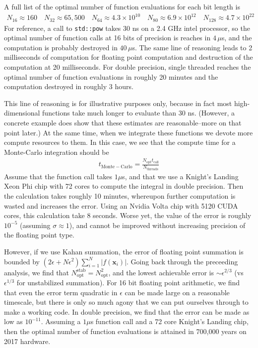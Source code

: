 \documentclass[landscape]{article}
\numberwithin{equation}{section}
\begin{document}
A full list of the optimal number of function evaluations for each bit length is
\begin{align*}
N_{16} \approx 160 \quad N_{32} \approx 65,500 \quad N_{64} \approx 4.3\times 10^{10} \quad N_{80} \approx 6.9\times 10^{12} \quad N_{128} \approx 4.7\times 10^{22}
\end{align*}
For reference, a call to \texttt{std::pow} takes 30 ns on a 2.4 GHz intel processor, so the optimal number of function calls at 16 bits of precision is reaches in $4 \, \mu$s, and the computation is probably destroyed in $40\, \mu$s.
The same line of reasoning leads to 2 milliseconds of computation for floating point computation and destruction of the computation at 20 milliseconds.
For double precision, single threaded reaches the optimal number of function evaluations in roughly 20 minutes and the computation destroyed in roughly 3 hours.

This line of reasoning is for illustrative purposes only, because in fact most high-dimensional functions take much longer to evaluate than 30 ns.
(However, a concrete example does show that these estimates are reasonable--more on that point later.)
At the same time, when we integrate these functions we devote more compute resources to them.
In this case, we see that the compute time for a Monte-Carlo integration should be
\begin{align*}
t_{\mathrm{Monte-Carlo} }= \frac{N_{\mathrm{opt}}t_{\mathrm{call}}}{N_{\mathrm{threads}}}
\end{align*}
Assume that the function call takes $1 \mu$s, and that we use a Knight's Landing Xeon Phi chip with 72 cores to compute the integral in double precision.
Then the calculation takes roughly 10 minutes, whereupon further computation is wasted and increases the error.
Using an Nvidia Volta chip with 5120 CUDA cores, this calculation take 8 seconds.
Worse yet, the value of the error is roughly $10^{-5}$ (assuming $\sigma \approx 1$), and cannot be improved without increasing precision of the floating point type.


However, if we use Kahan summation, the error of floating point summation is bounded by $ (2\epsilon + N\epsilon^2) \sum_{i=1}^{N} |f(\mathbf{x}_i)|$.
Going back through the preceeding analysis, we find that $N_{\mathrm{opt}}^{\mathrm{stab}} = N_{\mathrm{opt}}^{2}$, and the lowest achievable error is ${\sim}\epsilon^{2/3}$ (vs $\epsilon^{1/3}$ for unstabilized summation).
For 16 bit floating point arithmetic, we find that even the error term quadratic in $\epsilon$ can be made large on a reasonable timescale, but there is only so much agony that we can put ourselves through to make a working code.
In double precision, we find that the error can be made as low as $10^{-11}$. Assuming a $1 \mu$s function call and a 72 core Knight's Landing chip, then the optimal number of function evaluations is attained in 700,000 years on 2017 hardware.
\end{document}
